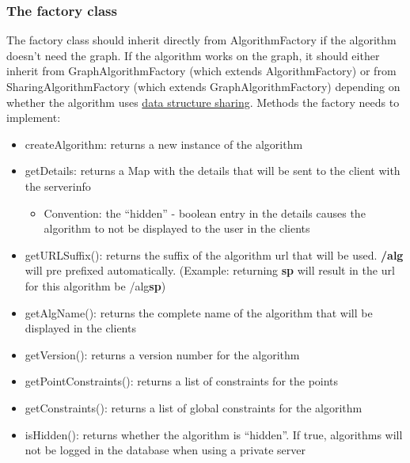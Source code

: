\documentclass[ngerman,titlepage,parskip=true]{scrartcl}
\begin{document}
	 \subsubsection{The factory class}
	 The factory class should inherit directly from AlgorithmFactory if the algorithm doesn't need the graph. If the algorithm works on the graph, it should either inherit from GraphAlgorithmFactory (which extends AlgorithmFactory) or from SharingAlgorithmFactory (which extends GraphAlgorithmFactory) depending on whether the algorithm uses \hyperref[sharing]{data structure sharing}.
	 Methods the factory needs to implement:
	 \begin{itemize}
	   \item createAlgorithm: returns a new instance of the algorithm
	   \item getDetails: returns a Map with the details that will be sent to the client with the serverinfo
	   \begin{itemize}
	     \item Convention: the ``hidden'' - boolean entry in the details causes the algorithm to not be displayed to the user in the clients
	   \end{itemize}
		\item getURLSuffix(): returns the suffix of the algorithm url that will be used. \textbf{/alg} will pre prefixed automatically. (Example: returning \textbf{sp} will result in the url for this algorithm be /alg\textbf{sp})
		\item getAlgName(): returns the complete name of the algorithm that will be displayed in the clients
		\item getVersion(): returns a version number for the algorithm
		\item getPointConstraints(): returns a list of constraints for the points
		\item getConstraints(): returns a list of global constraints for the algorithm
		\item isHidden(): returns whether the algorithm is ``hidden''. If true, algorithms will not be logged in the database when using a private server
	 \end{itemize}
	 
  \label{sharing}
\end{document}
